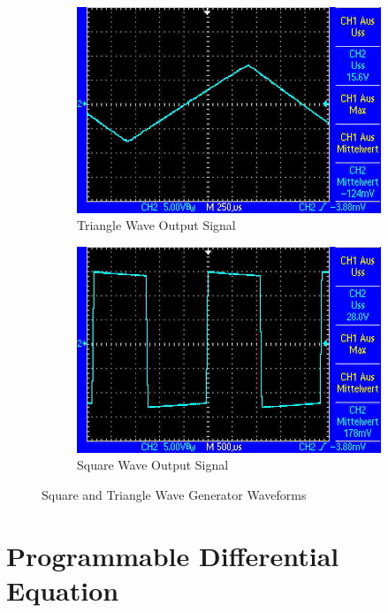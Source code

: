 \begin{figure}
	\centering
	\begin{subfigure}{0.4\textwidth}
		\centering
		\includegraphics[width=.9\linewidth]{./img/ss-wavegen-triag}
		\caption{Triangle Wave Output Signal}
	\end{subfigure}
	\begin{subfigure}{0.4\textwidth}
		\centering
		\includegraphics[width=.9\linewidth]{./img/ss-wavegen-squ}
		\caption{Square Wave Output Signal}
	\end{subfigure}
	\caption{Square and Triangle Wave Generator Waveforms}
	\label{ss:wavegen}
\end{figure}

\section{Programmable Differential Equation}

